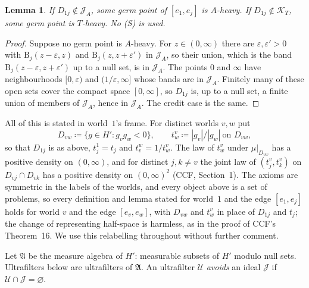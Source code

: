 \documentclass[11pt]{article}
\newtheorem{lemma}[theorem]{Lemma}
\theoremstyle{definition}\newtheorem{definition}[theorem]{Definition}
\theoremstyle{remark}\newtheorem{remark}[theorem]{Remark}
\newcommand{\Band}{\mathrm{B}}
\newcommand{\Jid}{\mathcal J}
\newcommand{\Kid}{\mathcal K}
\newcommand{\Uf}{\mathcal U}
\begin{document}
\begin{lemma}\label{lem:germ}
If $D_{1j}\notin\Jid_A$, some germ point of $[e_1,e_j]$ is $A$-heavy. If
$D_{1j}\notin\Kid_T$, some germ point is $T$-heavy. No (S) is used.
\end{lemma}
\begin{proof}
Suppose no germ point is $A$-heavy. For $z\in(0,\infty)$ there are
$\varepsilon,\varepsilon'>0$ with $\Band_j(z-\varepsilon,z)$ and
$\Band_j(z,z+\varepsilon')$ in $\Jid_A$, so their union, which is the band
$\Band_j(z-\varepsilon,z+\varepsilon')$ up to a null set, is in $\Jid_A$.
The points $0$ and $\infty$ have neighbourhoods $[0,\varepsilon)$ and
$(1/\varepsilon,\infty]$ whose bands are in $\Jid_A$. Finitely many of these
open sets cover the compact space $[0,\infty]$, so $D_{1j}$ is, up to a null
set, a finite union of members of $\Jid_A$, hence in $\Jid_A$. The credit
case is the same.
\end{proof}

All of this is stated in world~$1$'s frame. For distinct worlds $v,w$ put
\[
 D_{vw}\coloneqq\{g\in H':g_vg_w<0\},\qquad
 t^v_w\coloneqq|g_v|/|g_w|\ \text{on }D_{vw},
\]
so that $D_{1j}$ is as above, $t^1_j=t_j$ and $t^w_v=1/t^v_w$. The law of
$t^v_w$ under $\mu|_{D_{vw}}$ has a positive density on $(0,\infty)$, and
for distinct $j,k\ne v$ the joint law of $(t^v_j,t^v_k)$ on $D_{vj}\cap D_{vk}$
has a positive density on $(0,\infty)^2$ (CCF, Section~1). The axioms are
symmetric in the labels of the worlds, and every object above is a set of
problems, so every definition and lemma stated for world~$1$ and the edge
$[e_1,e_j]$ holds for world $v$ and the edge $[e_v,e_w]$, with $D_{vw}$ and
$t^v_w$ in place of $D_{1j}$ and $t_j$; the change of representing
half-space is harmless, as in the proof of CCF's Theorem~16. We use this
relabelling throughout without further comment.

Let $\mathfrak A$ be the measure algebra of $H'$: measurable subsets of $H'$
modulo null sets. Ultrafilters below are ultrafilters of $\mathfrak A$. An
ultrafilter $\Uf$ \emph{avoids} an ideal $\Jid$ if $\Uf\cap\Jid=\varnothing$.
\end{document}
